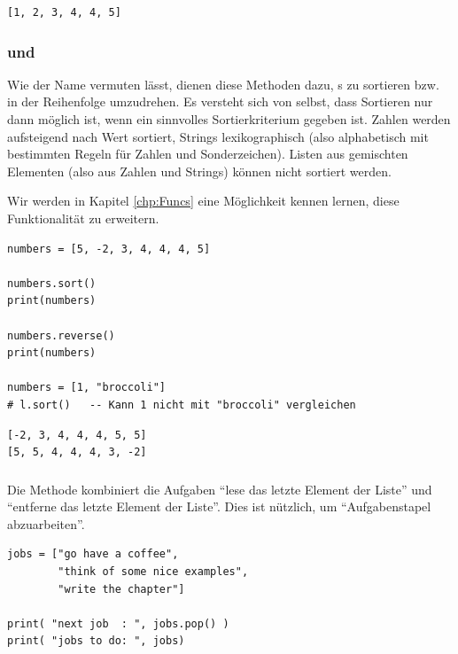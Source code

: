 \begin{cmdbox}[Ausgabe]
\begin{verbatim}
[1, 2, 3, 4, 4, 5]
\end{verbatim}
\end{cmdbox}

\subsubsection{ und }
Wie der Name vermuten lässt, dienen diese Methoden dazu, s zu sortieren bzw. in der Reihenfolge umzudrehen. Es versteht sich von selbst, dass Sortieren nur dann möglich ist, wenn ein sinnvolles Sortierkriterium gegeben ist. Zahlen werden aufsteigend nach Wert sortiert, Strings lexikographisch (also alphabetisch mit bestimmten Regeln für Zahlen und Sonderzeichen). Listen aus gemischten Elementen (also aus Zahlen und Strings) können nicht sortiert werden.

Wir werden in Kapitel \ref{chp:Funcs} eine Möglichkeit kennen lernen, diese Funktionalität zu erweitern.

\begin{codebox}
\begin{verbatim}
numbers = [5, -2, 3, 4, 4, 4, 5]

numbers.sort()
print(numbers)

numbers.reverse()
print(numbers)

numbers = [1, "broccoli"]
# l.sort()   -- Kann 1 nicht mit "broccoli" vergleichen
\end{verbatim}
\end{codebox}

\begin{cmdbox}[Ausgabe]
\begin{verbatim}
[-2, 3, 4, 4, 4, 5, 5]
[5, 5, 4, 4, 4, 3, -2]
\end{verbatim}
\end{cmdbox}

\subsubsection{}
Die Methode  kombiniert die Aufgaben \enquote{lese das letzte Element der Liste} und \enquote{entferne das letzte Element der Liste}. Dies ist nützlich, um \enquote{Aufgabenstapel abzuarbeiten}.

\begin{codebox}
\begin{verbatim}
jobs = ["go have a coffee", 
        "think of some nice examples", 
        "write the chapter"]

print( "next job  : ", jobs.pop() )
print( "jobs to do: ", jobs)
\end{verbatim}
\end{codebox}

